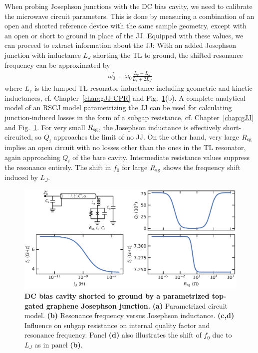When probing Josephson junctions with the DC bias cavity, we need to calibrate the microwave circuit parameters.
%
This is done by measuring a combination of an open and shorted reference device with the same sample geometry, except with an open or short to ground in place of the JJ.
%
Equipped with these values, we can proceed to extract information about the JJ:
%
With an added Josephson junction with inductance $L_J$ shorting the TL to ground, the shifted resonance frequency can be approximated by
%
\begin{align}
\omega_0^\prime = \omega_0\frac{L_r+L_J}{L_r+2L_J}
\label{eq:intro-omega0p}
\end{align}
%
where $L_r$ is the lumped TL resonator inductance including geometric and kinetic inductances, cf. Chapter~\ref{chap:gJJ-CPR} and Fig.~\ref{fig:TLmodel}(b).
%
A complete analytical model of an RSCJ model parametrizing the JJ can be used for calculating junction-induced losses in the form of a subgap resistance, cf. Chapter~\ref{chap:gJJ} and Fig.~\ref{fig:TLmodel}.
%
For very small $R_{\rm sg}$, the Josephson inductance is effectively short-circuited, so $Q_i$ approaches the limit of no JJ.
%
On the other hand, very large $R_{\rm sg}$ implies an open circuit with no losses other than the ones in the TL resonator, again approaching $Q_i$ of the bare cavity.
%
Intermediate resistance values suppress the resonance entirely.
%
The shift in $f_0$ for large $R_{\rm sg}$ shows the frequency shift induced by $L_J$.

\begin{figure}
	\centering
	\includegraphics[width=\linewidth]{chapter-introduction/figs/model_DC_bias_cavity_params_RCSJ.pdf}
	\caption{
		\textbf{DC bias cavity shorted to ground by a parametrized top-gated graphene Josephson junction.}
		\textbf{(a)} Parametrized circuit model.
		\textbf{(b)} Resonance frequency versus Josephson inductance.
		\textbf{(c,d)} Influence on subgap resistance on internal quality factor and resonance frequency.
		Panel \textbf{(d)} also illustrates the shift of $f_0$ due to $L_J$ as in panel \textbf{(b)}.
	}
	\label{fig:TLmodel}
\end{figure}


